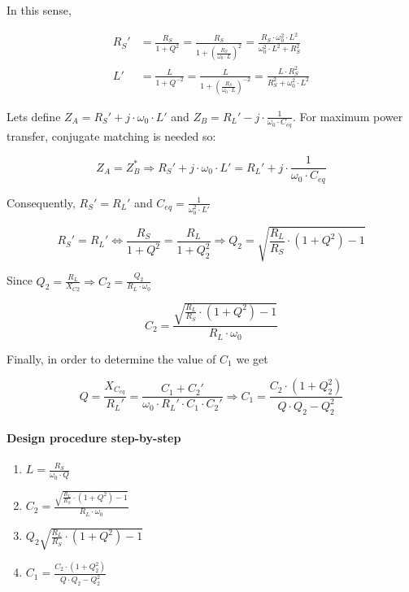 \noindent In this sense,

\begin{align}
  R_S' &= \frac{R_S}{1 + Q^2} = \frac{R_S}{1 + \left( \frac{R_S}{\omega_0 \cdot L} \right)^2} = \frac{R_S \cdot \omega_0^2 \cdot L^2}{\omega_0^2 \cdot L^2 + R_S^2}\\
  L' &= \frac{L}{1 + Q^{-2}} = \frac{L}{1 + \left( \frac{R_S}{\omega_0 \cdot L}\right)^{-2}} = \frac{L \cdot R_S^2}{R_S^2 + \omega_0^2 \cdot L^2}
\end{align}

\noindent Lets define $Z_A = R_S' + j \cdot \omega_0 \cdot L'$ and $Z_B = R_L' - j \cdot \frac{1}{\omega_0 \cdot C_{eq}}$. For maximum power transfer, conjugate matching is needed so:

\begin{equation}
Z_A = Z_B^* \Longrightarrow R_S' + j \cdot \omega_0 \cdot L' = R_L' + j \cdot \frac{1}{\omega_0 \cdot C_{eq}}
\end{equation}

\noindent Consequently, $R_S' = R_L'$ and $C_{eq} = \frac{1}{\omega_0^2 \cdot L'}$

\begin{equation}
R_S' = R_L' \Longleftrightarrow \frac{R_S}{1 + Q^2} = \frac{R_L}{1 + Q_2^2} \Longrightarrow Q_2 = \sqrt{\frac{R_L}{R_S} \cdot (1 + Q^2) - 1}
\end{equation}


\noindent Since $Q_2 = \frac{R_L}{X_{C2}} \Longrightarrow C_2 = \frac{Q_2}{R_L \cdot \omega_0}$

\begin{equation}
C_2 = \frac{\sqrt{\frac{R_L}{R_S} \cdot (1 + Q^2)  - 1 }}{R_L \cdot \omega_0}
\end{equation}

\noindent Finally, in order to determine the value of $C_1$ we get

\begin{equation}
Q = \frac{X_{C_{eq}}}{R_L'} = \frac{C_1 + C_2'}{\omega_0 \cdot R_L' \cdot C_1 \cdot C_2'} \Longrightarrow C_1 = \frac{C_2 \cdot (1 + Q_2^2)}{Q \cdot Q_2 - Q_2^2}
\end{equation}

\paragraph{Design procedure step-by-step}

\begin{enumerate}
  \item $L = \frac{R_S}{\omega_0 \cdot Q}$
  \item $C_2 = \frac{\sqrt{\frac{R_L}{R_S} \cdot (1 + Q^2) - 1 }}{R_L \cdot \omega_0}$
  \item $Q_2 \sqrt{\frac{R_L}{R_S} \cdot (1 + Q^2) - 1}$
  \item $C_1 = \frac{C_2 \cdot (1 + Q_2^2)}{Q \cdot Q_2 - Q_2^2}$
\end{enumerate}


